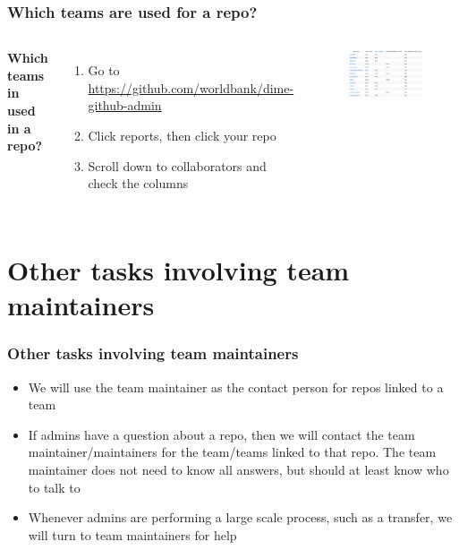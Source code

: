 \documentclass[aspectratio=169]{beamer} %
\begin{document}
\begin{frame}
	\frametitle{Which teams are used for a repo?}
	\begin{columns}[c]
		\textbf{Which teams in used in a repo?}
		\begin{enumerate}
			\item Go to \url{https://github.com/worldbank/dime-github-admin}
			\item Click reports, then click your repo
			\item Scroll down to collaborators and check the columns
		\end{enumerate}
		
		\begin{figure}
			\centering
			\includegraphics[width=1\linewidth]{./img/which-teams-in-repo}
		\end{figure}
	\end{columns}		
\end{frame}



\section{Other tasks involving team maintainers}

\begin{frame}
	\frametitle{Other tasks involving team maintainers}
	
	\begin{itemize}
		\item We will use the team maintainer as the contact person for repos linked to a team
		
		\item If admins have a question about a repo, then we will contact the team maintainer/maintainers for the team/teams linked to that repo. The team maintainer does not need to know all answers, but should at least know who to talk to 
		
		\item Whenever admins are performing a large scale process, such as a transfer, we will turn to team maintainers for help

	\end{itemize}
\end{frame}
\end{document}
